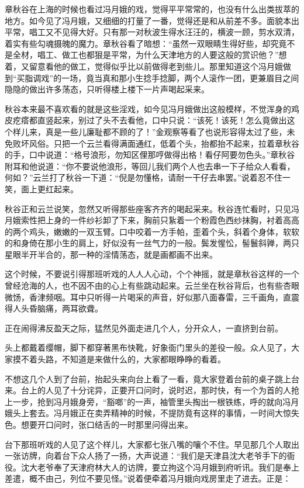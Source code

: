 \documentclass[12pt,UTF8]{ctexbook}
\begin{document}
{{{章秋谷在上海的时候也看过冯月娥的戏，觉得平平常常的，也没有什么出类拔萃的地方。如今见了冯月娥，又细细的打量了一番，觉得还是和从前差不多。面貌本出平常，唱工又不见得大好。只有那一对秋波生得水汪汪的，横波一顾，剪水双清，着实有些勾魂摄魄的魔力。章秋谷看了暗想：“虽然一双眼睛生得好些，却究竟不是全材，唱工、做工也都狠是平常，为什么天津地方的人要这般的赏识他？”想着，又留意看他的做工，觉得似乎比以前做得老到些儿。那里知道这个冯月娥做到“买脂调戏”的一场，竟当真和那小生捻手捻脚，两个人滚作一团，更兼眉目之间隐隐的做出许多荡态，只听得楼上楼下一片声喝起采来。

秋谷本来最不喜欢看的就是这些淫戏，如今见冯月娥做出这般模样，不觉浑身的鸡皮疙瘩都直竖起来，别过了头不去看他，口中只说：“该死！该死！怎么竟做出这个样儿来，真是一些儿廉耻都不顾的了！”金观察等看了也说形容得太过了些，未免败坏风俗。只把一个云兰看得满面通红，低着个头，抬都抬不起来，拉着章秋谷的手，口中说道：“格号浪形，勿知区俚那哼做得出格！看仔阿要勿色头。”章秋谷附耳和他说道：“你不要说他浪形，等回儿我们两个人也去串一下子给众人看看，何如？”云兰打了秋谷一下道：“倪是勿懂格，请耐一干仔去串罢。”说着忍不住一笑，面上更红起来。

秋谷正和云兰说笑，忽然又听得那些座客齐齐的喝起采来。秋谷连忙看时，只见冯月娥索性把上身的一件纱衫卸了下来，胸前只紥着一个粉霞色西纱抹胸，衬着高高的两个鸡头，嫩嫩的一双玉臂。口中咬着一方手帕，歪着个头，斜着个身体，软软的和身倚在那小生的肩上，好似没有一丝气力的一般。鬓发惺忪，髻鬟斜亸，两只星眼半开半合的，那一种的淫情荡态，就是画都画不出来。

这个时候，不要说引得那班听戏的人人人心动，个个神摇，就是章秋谷这样的一个曾经沧海的人，也不因不由的心上有些跳动起来。云兰坐在秋谷背后，也有些杏眼微饧，香津频咽。耳中只听得一片喝采的声音，好似那八面春雷，三千画角，直震得人头昏脑痛，两耳欲聋。

正在闹得沸反盈天之际，猛然见外面走进几个人，分开众人，一直挤到台前。

头上都戴着缨帽，脚下都穿著黑布快靴，好象衙门里头的差役一般。众人见了，大家摸不着头路，不知道是来做什么的，大家都眼睁睁的看着。

不想这几个人到了台前，抬起头来向台上看了一看，竟大家登着台前的桌子跳上台来。台上的人见了十分诧异，正要开口问时，说时迟，那时快，有一个为首的人抢上一步，抢到冯月娥身旁，“豁啷”的一声，袖管里头掏出一根铁练，呼的就向冯月娥头上套去。冯月娥正在卖弄精神的时候，不提防竟有这样的事情，一时间大惊失色。想要开口问时，张口结舌的一时那里问得出来。

台下那班听戏的人见了这个样儿，大家都七张八嘴的嚷个不住。早见那几个人取出一张访牌，向着台下众人扬了一扬，大声说道：“我们是天津县沈大老爷手下的衙役。沈大老爷奉了天津府林大人的访牌，要立拘这个冯月娥到府听讯。我们是奉上差遣，概不由己，列位不要见怪。”说着便牵着冯月娥向戏房里走了进去。正是：

}}}
\end{document}
